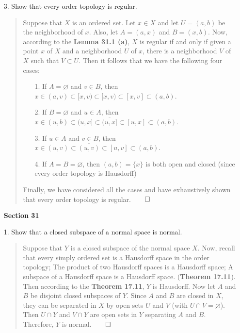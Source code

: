 \documentclass[12pt, a4paper]{article}
\renewcommand{\emptyset}{\varnothing}  %
\begin{document}
\begin{itemize}
\newpage

\item[3.]
Show that every order topology is regular.
\begin{quote}
Suppose that $X$ is an ordered set. Let $x \in X$ and let $U = (a, b)$
be the neighborhood of $x$. Also, let $A = (a, x)$ and $B = (x, b)$.
Now, according to the \textbf{Lemma 31.1 (a)}, $X$ is regular if and only if given a point $x$ of $X$ and a neighborhood
$U$ of $x$, there is a neighborhood $V$ of $X$ such that $\bar{V} \subset U$.
Then it follows that we have the following four cases:
\begin{itemize}
\item[1.]
If $A = \emptyset$ and $v \in B$, then $x \in (a, v) \subset [x, v) \subset \overline{[x, v)} \subset [x, v] \subset (a, b)$.
\item[2.]
If $B = \emptyset$ and $u \in A$, then $x \in (u, b) \subset (u, x] \subset \overline{(u, x]} \subset [u, x] \subset (a, b)$.
\item[3.]
If $u \in A$ and $v \in B$, then $x \in (u, v) \subset \overline{(u, v)} \subset [u, v] \subset (a, b)$.
\item[4.]
If $A = B = \emptyset$, then $(a, b) = \{x\}$ is both open and closed (since every order topology is Hausdorff)
\end{itemize}
Finally, we have considered all the cases and have exhaustively shown that every order topology is regular.$\qed$
\end{quote}


\item[]
\item[]
\item[]
{\large \textbf{Section 31}}
\vspace{0.3cm}

\item[1.]
Show that a closed subspace of a normal space is normal.
\begin{quote}
Suppose that $Y$ is a closed subspace of the normal space $X$.
Now, recall that every simply ordered set is a Hausdorff space in the
order topology; The product of two Hausdorff spaces is a Hausdorff space;
A subspace of a Hausdorff space is a Hausdorff space. (\textbf{Theorem 17.11}).
Then according to the \textbf{Theorem 17.11}, $Y$ is Hausdorff.
Now let $A$ and $B$ be disjoint closed subspaces of $Y$. Since $A$ and $B$ are
closed in $X$, they can be separated in $X$ by open sets $U$ and $V$ (with $U \cap V = \emptyset$).
Then $U \cap Y$ and $V \cap Y$ are open sets in $Y$ separating $A$ and $B$.
Therefore, $Y$ is normal.$\qed$
\end{quote}

\end{itemize}
\end{document}
